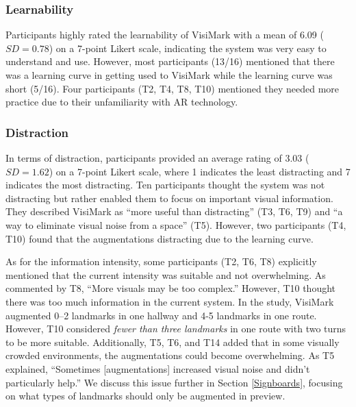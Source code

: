\subsubsection{Learnability}
Participants highly rated the learnability of VisiMark with a mean of 6.09 ($SD=0.78$) on a 7-point Likert scale, indicating the system was very easy to understand and use. 
However, most participants (13/16) mentioned that there was a learning curve in getting used to VisiMark while the learning curve was short (5/16). Four participants (T2, T4, T8, T10) mentioned they needed more practice due to their unfamiliarity with AR technology. %

\subsubsection{Distraction}
\label{Distraction}
In terms of distraction, participants provided an average rating of 3.03 ($SD=1.62$) on a 7-point Likert scale, where 1 indicates the least distracting and 7 indicates the most distracting. Ten participants thought the system was not distracting but rather enabled them to focus on important visual information. They described VisiMark as ``more useful than distracting'' (T3, T6, T9) and ``a way to eliminate visual noise from a space'' (T5). %
However, two participants (T4, T10) found that the augmentations distracting due to the learning curve.

As for the information intensity, some participants (T2, T6, T8) explicitly mentioned that the current intensity was suitable and not overwhelming. As commented by T8, ``More visuals may be too complex.'' 
However, T10 thought there was too much information in the current system. In the study, VisiMark augmented 0–2 landmarks in one hallway and 4-5 landmarks in one route. However, T10 considered \textit{fewer than three landmarks} in one route with two turns to be more suitable. Additionally, T5, T6, and T14 added that in some visually crowded environments, the augmentations could become overwhelming. As T5 explained, ``Sometimes [augmentations] increased visual noise and didn't particularly help.'' We discuss this issue further in Section \ref{Signboards}, focusing on what types of landmarks should only be augmented in preview.

